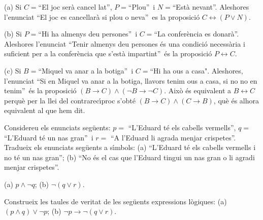\begin{solucio}
(a) Si $C=$\textquotedblleft El joc ser\`{a} cancel\textperiodcentered
lat\textquotedblright, $P=$\textquotedblleft Plou\textquotedblright\ i
$N=$\textquotedblleft Est\`{a} nevant\textquotedblright. Aleshores l'enunciat
\textquotedblleft El joc es cancel\textperiodcentered lar\`{a} si plou o
neva\textquotedblright\ es la proposici\'{o} $C\leftrightarrow(P\vee N)$.

(b) Si $P=$\textquotedblleft Hi ha almenys deu persones\textquotedblright\ i
$C=$\textquotedblleft La confer\`{e}ncia es donar\`{a}\textquotedblright.
Aleshores l'enunciat \textquotedblleft Tenir almenys deu persones \'{e}s una
condici\'{o} necess\`{a}ria i suficient per a la confer\`{e}ncia que
s'est\`{a} impartint\textquotedblright\ \'{e}s la proposici\'{o}
$P\longleftrightarrow C$.

(c) Si $B=$\textquotedblleft Miquel va anar a la botiga\textquotedblright\ i
$C=$\textquotedblleft Hi ha ous a casa". Aleshores, l'enunciat
\textquotedblleft Si en Miquel va anar a la botiga, llavors tenim ous a casa,
si no no en tenim\textquotedblright\ \'{e}s la proposici\'{o} $(B\rightarrow
C)\wedge(\lnot B\rightarrow\lnot C)$. Aix\`{o} \'{e}s equivalent a
$B\longleftrightarrow C$ perqu\`{e} per la llei del contrarec\'{\i}proc
s'obt\'{e} $(B\rightarrow C)\wedge(C\rightarrow B)$, qu\`{e} \'{e}s alhora
equivalent al que hem dit.
\end{solucio}

\begin{exercici}
Considereu els enunciats seg\"{u}ents: $p=$ \textquotedblleft L'Eduard t\'{e}
els cabells vermells\textquotedblright, $q=$ \textquotedblleft L'Eduard t\'{e}
un nas gran\textquotedblright\ i $r=$ \textquotedblleft A l'Eduard li agrada
menjar crispetes\textquotedblright. Tradueix els enunciats seg\"{u}ents a
s\'{\i}mbols: (a) \textquotedblleft L'Eduard t\'{e} els cabells vermells i no
t\'{e} un nas gran\textquotedblright; (b) \textquotedblleft No \'{e}s el cas
que l'Eduard tingui un nas gran o li agradi menjar crispetes\textquotedblright.
\end{exercici}

\begin{solucio}
(a) $p\wedge\lnot q$; (b) $\lnot(q\vee r)$.
\end{solucio}

\begin{exercici}
Construeix les taules de veritat de les seg\"{u}ents expressions l\`{o}giques:
(a) $(p\wedge q)\vee\lnot p$; (b) $\lnot p\longrightarrow\lnot(q\vee r)$.
\end{exercici}


